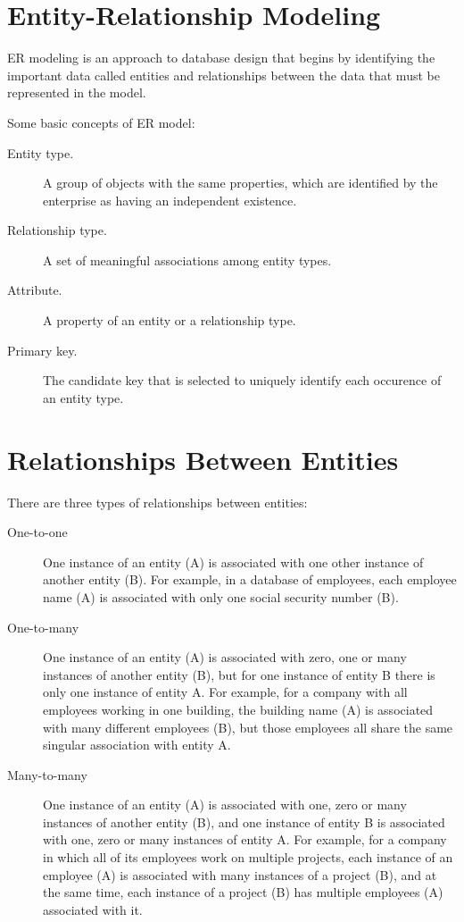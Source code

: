 \documentclass[•]{article}
\begin{document}
\section{Entity-Relationship Modeling\cite{connolly2005database}}
ER modeling is an approach to database design that begins by identifying the important data
called entities and relationships between the data that must be represented in
the model. \par 
Some basic concepts of ER model:
\begin{description}
\item[Entity type.] A group of objects with the same properties, which are identified by the enterprise as having an independent existence.
\item[Relationship type.] A set of meaningful associations among entity types.
\item[Attribute.] A property of an entity or a relationship type.
\item[Primary key.] The candidate key that is selected to uniquely identify each occurence of an entity type.
\end{description}
\section{Relationships Between Entities \cite{beal} }
There are three types of relationships between entities:
\begin{description}
\item[One-to-one]One instance of an entity (A) is associated with one other instance of another entity (B). For example, in a database of employees, each employee name (A) is associated with only one social security number (B).
\item[One-to-many]One instance of an entity (A) is associated with zero, one or many instances of another entity (B), but for one instance of entity B there is only one instance of entity A. For example, for a company with all employees working in one building, the building name (A) is associated with many different employees (B), but those employees all share the same singular association with entity A.
\item[Many-to-many]One instance of an entity (A) is associated with one, zero or many instances of another entity (B), and one instance of entity B is associated with one, zero or many instances of entity A. For example, for a company in which all of its employees work on multiple projects, each instance of an employee (A) is associated with many instances of a project (B), and at the same time, each instance of a project (B) has multiple employees (A) associated with it.
\end{description}
\end{document}
